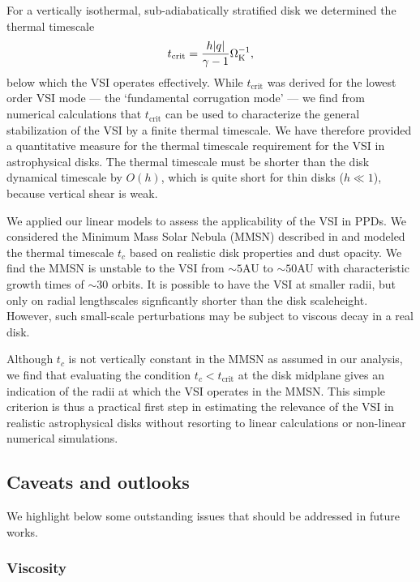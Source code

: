 For a vertically isothermal, sub-adiabatically stratified disk we
determined the thermal timescale   
\begin{align*}
  t_\mathrm{crit} = \frac{ h |q|}{\gamma-1}\Omega_{\rm K}^{-1}, 
\end{align*}
below which the VSI operates effectively. While $t_\mathrm{crit}$ was
derived for the lowest order VSI mode --- the `fundamental  
corrugation mode' --- we find from numerical calculations that
$t_\mathrm{crit}$ can be used to characterize the general
stabilization of the VSI by a finite thermal timescale. %
We have therefore provided a quantitative measure for the thermal
timescale requirement for the VSI in astrophysical 
disks. The thermal timescale must be shorter than the disk
dynamical timescale by $O( h)$, which is
quite short for thin disks ($ h\ll 1$), because vertical shear is weak.    

We applied our linear models to assess the applicability of the VSI in
PPDs. We considered the Minimum Mass Solar Nebula 
(MMSN) described in \cite{chiang10} and   
modeled the thermal timescale $t_c$ based on realistic
disk properties and dust opacity. 
We find the MMSN is unstable to the VSI 
from $\sim 5$AU to $\sim50$AU with characteristic growth times of
$\sim 30$ orbits. It is possible to have the VSI at smaller
radii, but only on radial lengthscales signficantly shorter
than the disk scaleheight. However, such small-scale perturbations may 
be subject to viscous decay in a real disk.   

Although $t_c$ is not vertically constant in the 
MMSN as assumed in our analysis, we find that evaluating the condition
$t_c< t_\mathrm{crit}$ at the disk midplane gives an indication of the
radii at which the VSI operates in the MMSN. This simple criterion is
thus a practical first step in estimating the relevance of the VSI in
realistic astrophysical disks without resorting to linear
calculations or non-linear numerical simulations.   

\subsection{Caveats and outlooks} 
We highlight below some outstanding issues that should be addressed in
future works. 


\subsubsection{Viscosity} 

